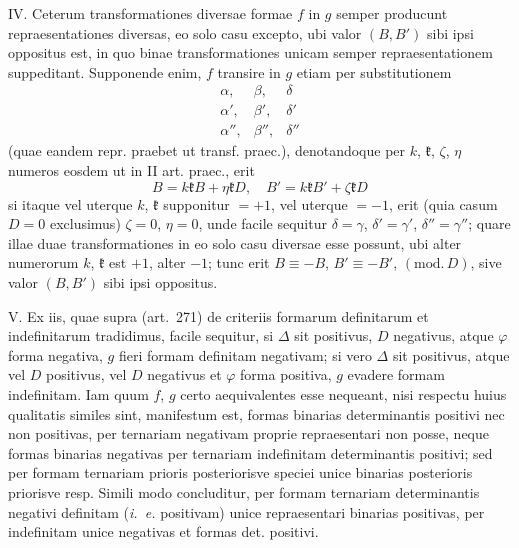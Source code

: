 IV. Ceterum transformationes diversae formae $f$ in $g$ semper producunt repraesentationes diversas, eo solo casu excepto, ubi valor $(B,B')$ sibi ipsi oppositus est, in quo binae transformationes unicam semper repraesentationem suppeditant. Supponende enim, $f$ transire in $g$ etiam per substitutionem
\[
\begin{array}{ccc}
\alpha,&\beta,&\delta\\
\alpha',&\beta',&\delta'\\
\alpha'',&\beta'',&\delta''
\end{array}
\]
(quae eandem repr. praebet ut transf. praec.), denotandoque per $k$, $\mathfrak{k}$, $\zeta$, $\eta$ numeros eosdem ut in II art. praec., erit
\[
B=k\mathfrak{k}B+\eta\mathfrak{k}D,\quad B'=k\mathfrak{k}B'+\zeta\mathfrak{k}D
\]
si itaque vel uterque $k$, $\mathfrak{k}$ supponitur $=+1$, vel uterque $=-1$, erit (quia casum $D=0$ exclusimus) $\zeta=0$, $\eta=0$, unde facile sequitur $\delta=\gamma$, $\delta'=\gamma'$, $\delta''=\gamma''$; quare illae duae transformationes in eo solo casu diversae esse possunt, ubi alter numerorum $k$, $\mathfrak{k}$ est $+1$, alter $-1$; tunc erit $B\equiv-B$, $B'\equiv-B'$, $(\mathrm{mod.}\,D)$, sive valor $(B,B')$ sibi ipsi oppositus.

V. Ex iis, quae supra (art.~271) de criteriis formarum definitarum et indefinitarum tradidimus, facile sequitur, si $\Delta$ sit positivus, $D$ negativus, atque $\varphi$ forma negativa, $g$ fieri formam definitam negativam; si vero $\Delta$ sit positivus, atque vel $D$ positivus, vel $D$ negativus et $\varphi$ forma positiva, $g$ evadere formam indefinitam. Iam quum $f$, $g$ certo aequivalentes esse nequeant, nisi respectu huius qualitatis similes sint, manifestum est, formas binarias determinantis positivi nec non positivas, per ternariam negativam proprie repraesentari non posse, neque formas binarias negativas per ternariam indefinitam determinantis positivi; sed per formam ternariam prioris posteriorisve speciei unice binarias posterioris priorisve resp. Simili modo concluditur, per formam ternariam determinantis negativi definitam (\textit{i.~e.} positivam) unice repraesentari binarias positivas, per indefinitam unice negativas et formas det. positivi.

